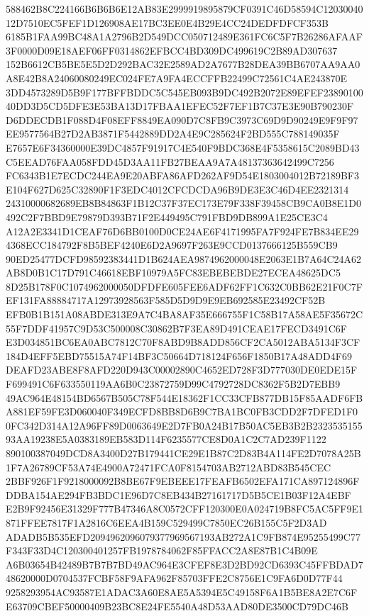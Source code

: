 \documentclass[UTF8,fontset=fandol,zihao=-4,a4paper]{ctexart}
\begin{document}
{{588462B8C224166B6B6B6E12AB83E2999919895879CF0391C46D58594C1203004012D7510EC5FEF1D126908AE17BC3EE0E4B29E4CC24DEDFDFCF353B
6185B1FAA99BC48A1A2796B2D549DCC050712489E361FC6C5F7B26286AFAAF3F0000D09E18AEF06FF0314862EFBCC4BD309DC499619C2B89AD307637
152B6612CB5BE5E5D2D292BAC32E2589AD2A7677B28DEA39BB6707AA9AA0A8E42B8A24060080249EC024FE7A9FA4ECCFFB22499C72561C4AE243870E
3DD4573289D5B9F177BFFBDDC5C545EB093B9DC492B2072E89EFEF2389010040DD3D5CD5DFE3E53BA13D17FBAA1EFEC52F7EF1B7C37E3E90B790230F
D6DDECDB1F088D4F08EFF8849EA090D7C8FB9C3973C69D9D90249E9F9F97EE9577564B27D2AB3871F5442889DD2A4E9C285624F2BD555C788149035F
E7657E6F34360000E39DC4857F91917C4E540F9BDC368E4F5358615C2089BD43C5EEAD76FAA058FDD45D3AA11FB27BEAA9A7A48137363642499C7256
FC6343B1E7ECDC244EA9E20ABFA86AFD262AF9D54E1803004012B72189BF3E104F627D625C32890F1F3EDC4012CFCDCDA96B9DE3E3C46D4EE2321314
24310000682689EB8B84863F1B12C37F37EC173E79F338F39458CB9CA0B8E1D0492C2F7BBD9E79879D393B71F2E449495C791FBD9DB899A1E25CE3C4
A12A2E3341D1CEAF76D6BB0100D0CE24AE6F4171995FA7F924FE7B834EE294368ECC184792F8B5BEF4240E6D2A9697F263E9CCD0137666125B559CB9
90ED25477DCFD98592383441D1B624AEA9874962000048E2063E1B7A64C24A62AB8D0B1C17D791C46618EBF10979A5FC83EBEBEBDE27ECEA48625DC5
8D25B178F0C1074962000050DFDFE605FEE6ADF62FF1C632C0BB62E21F0C7FEF131FA88884717A12973928563F585D5D9D9E9EB692585E23492CF52B
EFB0B1B151A08ABDE313E9A7C4BA8AF35E666755F1C58B17A58AE5F35672C55F7DDF41957C9D53C500008C30862B7F3EA89D491CEAE17FECD3491C6F
E3D034851BC6EA0ABC7812C70F8ABD9B8ADD856CF2CA5012ABA5134F3CF184D4EFF5EBD75515A74F14BF3C50664D718124F656F1850B17A48ADD4F69
DEAFD23ABE8F8AFD220D943C00002890C4652ED728F3D777030DE0EDE15FF699491C6F633550119AA6B0C23872759D99C4792728DC8362F5B2D7EBB9
49AC964E48154BD6567B505C78F544E18362F1CC33CFB877DB15F85AADF6FBA881EF59FE3D060040F349ECFD8BB8D6B9C7BA1BC0FB3CDD2F7DFED1F0
0FC342D314A12A96FF89D0063649E2D7FB0A24B17B50AC5EB3B2B232353515593AA19238E5A0383189EB583D114F6235577CE8D0A1C2C7AD239F1122
890100387049DCD8A3400D27B179441CE29E1B87C2D83B4A114FE2D7078A25B1F7A26789CF53A74E4900A72471FCA0F8154703AB2712ABD83B545CEC
2BBF926F1F9218000092B8BE67F9EBEEE17FEAFB6502EFA171CA897124896FDDBA154AE294FB3BDC1E96D7C8EB434B27161717D5B5CE1B03F12A4EBF
E2B9F92456E31329F777B47346A8C0572CFF120300E0A024719B8FC5AC5FF9E1871FFEE7817F1A2816C6EEA4B159C529499C7850EC26B155C5F2D3AD
ADADB5B535EFD2094962096079377969567193AB272A1C9FB874E95255499C77F343F33D4C120300401257FB1978784062F85FFACC2A8E87B1C4B09E
A6B03654B42489B7B7B7BD49AC964E3CFEF8E3D2BD92CD6393C45FFBDAD748620000D0704537FCBF58F9AFA962F85703FFE2C8756E1C9FA6D0D77F44
9258293954AC93587E1ADAC3A60E8AE5A5394E5C49158F6A1B5BE8A2E7C6FE63709CBEF50000409B23BC8E24FE5540A48D53AAD80DE3500CD79DC46B
}}
\end{document}
